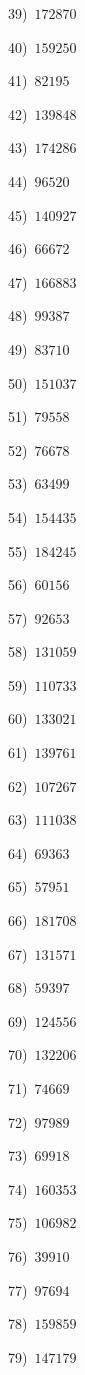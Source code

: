 \documentclass{article}
\begin{document}
\begin{multicols}{2}
39)$\,\,\,172870$ \par 
40)$\,\,\,159250$ \par 
41)$\,\,\,82195$ \par 
42)$\,\,\,139848$ \par 
43)$\,\,\,174286$ \par 
44)$\,\,\,96520$ \par 
45)$\,\,\,140927$ \par 
46)$\,\,\,66672$ \par 
47)$\,\,\,166883$ \par 
48)$\,\,\,99387$ \par 
49)$\,\,\,83710$ \par 
50)$\,\,\,151037$ \par 
51)$\,\,\,79558$ \par 
52)$\,\,\,76678$ \par 
53)$\,\,\,63499$ \par 
54)$\,\,\,154435$ \par 
55)$\,\,\,184245$ \par 
56)$\,\,\,60156$ \par 
57)$\,\,\,92653$ \par 
58)$\,\,\,131059$ \par 
59)$\,\,\,110733$ \par 
60)$\,\,\,133021$ \par 
61)$\,\,\,139761$ \par 
62)$\,\,\,107267$ \par 
63)$\,\,\,111038$ \par 
64)$\,\,\,69363$ \par 
65)$\,\,\,57951$ \par 
66)$\,\,\,181708$ \par 
67)$\,\,\,131571$ \par 
68)$\,\,\,59397$ \par 
69)$\,\,\,124556$ \par 
70)$\,\,\,132206$ \par 
71)$\,\,\,74669$ \par 
72)$\,\,\,97989$ \par 
73)$\,\,\,69918$ \par 
74)$\,\,\,160353$ \par 
75)$\,\,\,106982$ \par 
76)$\,\,\,39910$ \par 
77)$\,\,\,97694$ \par 
78)$\,\,\,159859$ \par 
79)$\,\,\,147179$ \par 

\end{multicols}
\end{document}
